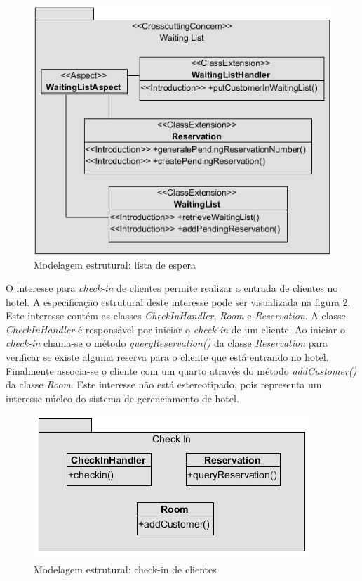   \begin{figure}[!h]
	\centering
	\includegraphics[scale=0.8]{img/case_study_structural_waiting_list.png}
	\caption{Modelagem estrutural: lista de espera}\label{fig:case_study_structural_waiting_list}
  \end{figure}
  
O interesse para \textit{check-in} de clientes permite realizar a entrada de clientes no hotel. A especificação estrutural deste interesse pode ser
visualizada na figura \ref{fig:case_study_structural_check_in}. Este interesse contém as classes \textit{CheckInHandler}, \textit{Room} e
\textit{Reservation}. A classe \textit{CheckInHandler} é responsável por iniciar o \textit{check-in} de um cliente. Ao iniciar o \textit{check-in}
chama-se o método \textit{queryReservation()} da classe \textit{Reservation} para verificar se existe alguma reserva para o cliente que está entrando
no hotel. Finalmente associa-se o cliente com um quarto através do método \textit{addCustomer()} da classe \textit{Room}. Este interesse não está
estereotipado, pois representa um interesse núcleo do sistema de gerenciamento de hotel.

  \begin{figure}[!h]
	\centering
	\includegraphics{img/case_study_structural_check_in.png}
	\caption{Modelagem estrutural: check-in de clientes}\label{fig:case_study_structural_check_in}
  \end{figure}

